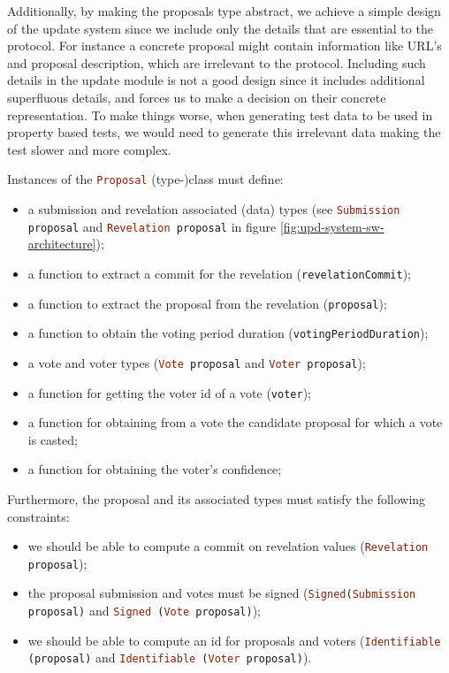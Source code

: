 Additionally, by making the proposals type abstract, we achieve a simple design
of the update system since we include only the details that are essential to
the protocol. For instance a concrete proposal might contain information like
URL's and proposal description, which are irrelevant to the protocol. Including
such details in the update module is not a good design since it includes
additional superfluous details, and forces us to make a decision on their
concrete representation. To make things worse, when
generating test data to be used in property based tests, we would need to
generate this irrelevant data making the test slower and more complex.

Instances of the \lstinline[language=Haskell]!Proposal! (type-)class must 
define:
\begin{itemize}
	\item a submission and revelation associated (data) types (see
	\lstinline[language=Haskell]!Submission proposal! and 
	\lstinline[language=Haskell]!Revelation proposal! in figure 
	\ref{fig:upd-system-sw-architecture});
	\item a function to extract a commit for the revelation
	(\lstinline[language=Haskell]!revelationCommit!);
	\item a function to extract the proposal from the revelation
	(\lstinline[language=Haskell]!proposal!);
	\item a function to obtain the voting period duration
	(\lstinline[language=Haskell]!votingPeriodDuration!);
	\item a vote and voter types (\lstinline[language=Haskell]!Vote proposal! 
	and 
	\lstinline[language=Haskell]!Voter proposal!);
	\item a function for getting the voter id of a vote 
	(\lstinline[language=Haskell]!voter!);
	\item a function for obtaining from a vote the candidate proposal for which 
	a 
	vote is 
	casted;
	\item a function for obtaining the voter's confidence;
\end{itemize}
Furthermore, the proposal and its associated types must satisfy the following
constraints:
\begin{itemize}
	\item we should be able to compute a commit on revelation values
	(\lstinline[language=Haskell]!Revelation proposal!);
	\item the proposal submission and votes must be signed 
	(\lstinline[language=Haskell]!Signed(Submission proposal)! and 
	\lstinline[language=Haskell]!Signed (Vote proposal)!);
	\item we should be able to compute an id for proposals and voters
	(\lstinline[language=Haskell]!Identifiable (proposal)! and 
	\lstinline[language=Haskell]!Identifiable (Voter proposal)!).
\end{itemize}

